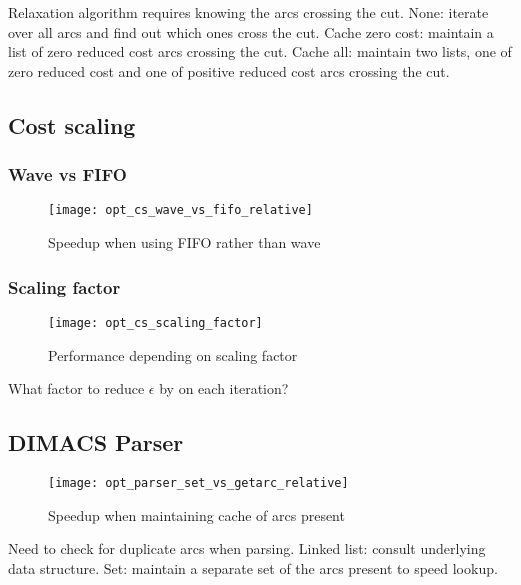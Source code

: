 Relaxation algorithm requires knowing the arcs crossing the cut. None: iterate over all arcs and find out which ones cross the cut. Cache zero cost: maintain a list of zero reduced cost arcs crossing the cut. Cache all: maintain two lists, one of zero reduced cost and one of positive reduced cost arcs crossing the cut.

\subsection{Cost scaling}

\subsubsection{Wave vs FIFO}

\begin{figure}
    \centering
    \texttt{[image: opt\_cs\_wave\_vs\_fifo\_relative]}
    \caption{Speedup when using FIFO rather than wave}
    \label{fig:opt-cs-wave-vs-fifo}
\end{figure}


\subsubsection{Scaling factor}

\begin{figure}
    \centering
    \texttt{[image: opt\_cs\_scaling\_factor]}
    \caption{Performance depending on scaling factor}
    \label{fig:opt-cs-scaling-factor}
\end{figure}

What factor to reduce $\epsilon$ by on each iteration?

\subsection{DIMACS Parser}

\begin{figure}
    \centering
    \texttt{[image: opt\_parser\_set\_vs\_getarc\_relative]}
    \caption{Speedup when maintaining cache of arcs present}
    \label{fig:opt-dimacs-parser}
\end{figure}

Need to check for duplicate arcs when parsing. Linked list: consult underlying data structure. Set: maintain a separate set of the arcs present to speed lookup.

